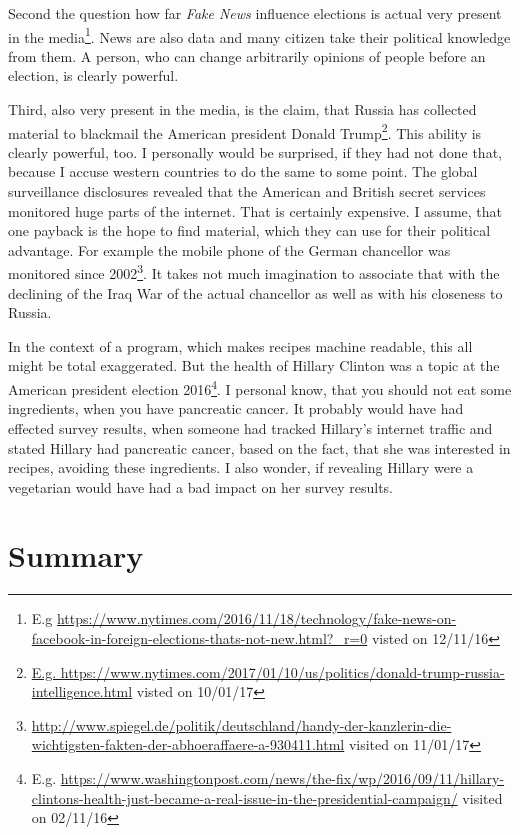 \documentclass[12pt, twoside]{report}
\begin{document}
Second the question how far \textit{Fake News} influence elections is actual very present in the media\footnote{E.g \url{https://www.nytimes.com/2016/11/18/technology/fake-news-on-facebook-in-foreign-elections-thats-not-new.html?_r=0} visted on 12/11/16}. News are also data and many citizen take their political knowledge from them. A person, who can change arbitrarily opinions of people before an election, is clearly powerful.   

Third, also very present in the media, is the claim, that Russia has collected material to blackmail the American president Donald Trump\footnote{\url{E.g. https://www.nytimes.com/2017/01/10/us/politics/donald-trump-russia-intelligence.html} visted on 10/01/17}. This ability is clearly powerful, too. I personally would be surprised, if they had not done that, because I accuse western countries to do the same to some point. The global surveillance disclosures revealed that the American and British secret services monitored huge parts of the internet. That is certainly expensive. I assume, that one payback is the hope to find material, which they can use for their political advantage. For example the mobile phone of the German chancellor was monitored since 2002\footnote{\url{http://www.spiegel.de/politik/deutschland/handy-der-kanzlerin-die-wichtigsten-fakten-der-abhoeraffaere-a-930411.html} visited on 11/01/17}. It takes not much imagination to associate that with the declining of the Iraq War of the actual chancellor as well as with his closeness to Russia.

In the context of a program, which makes recipes machine readable, this all might be total exaggerated. But the health of Hillary Clinton was a topic at the American president election 2016\footnote{E.g. \url{https://www.washingtonpost.com/news/the-fix/wp/2016/09/11/hillary-clintons-health-just-became-a-real-issue-in-the-presidential-campaign/} visited on 02/11/16}. I personal know, that you should not eat some ingredients, when you have pancreatic cancer. It probably would have had effected survey results, when someone had tracked Hillary's internet traffic and stated Hillary had pancreatic cancer, based on the fact, that she was interested in recipes, avoiding these ingredients. I also wonder, if revealing Hillary were a vegetarian would have had a bad impact on her survey results. 


\chapter{Summary}
\end{document}

